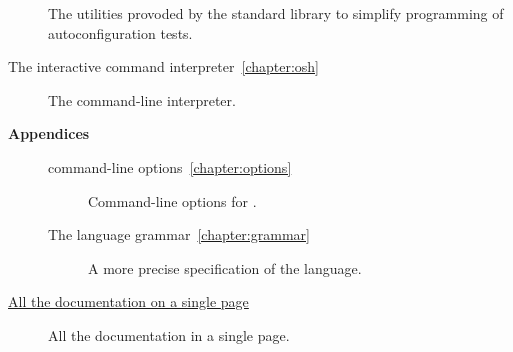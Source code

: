\begin{description}
%
   The utilities provoded by the \OMake{} standard library to simplify
   programming of autoconfiguration tests.
\item[The interactive command interpreter~\ref{chapter:osh}]
%
   The  command-line interpreter.
\item[\textbf{Appendices}]
\begin{description}
\item[\OMake{} command-line options~\ref{chapter:options}]
%
   Command-line options for .
%
\item[The \OMake{} language grammar~\ref{chapter:grammar}]
%
   A more precise specification of the \OMake{} language.
\end{description}
\item[\href{omake-doc.html}{All the documentation on a single page}]
%
   All the \OMake{} documentation in a single page.
\end{description}

